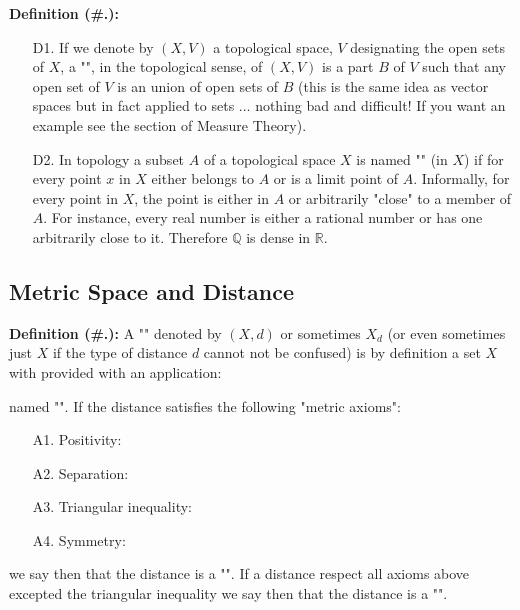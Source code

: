 	\textbf{Definition (\#\thesection.\mydef):} 
	\begin{enumerate}
		\item[D1.] If we denote by $(X, V)$ a topological space, $V$ designating the open sets of $X$, a "", in the topological sense, of $(X, V)$ is a part $B$ of $V$ such that any open set of $V$ is an union of open sets of $B$ (this is the same idea as vector spaces but in fact applied to sets ... nothing bad and difficult! If you want an example see the section of Measure Theory).
		
		\item[D2.] In topology a subset $A$ of a topological space $X$ is named "\label{dense set}" (in $X$) if for every point $x$ in $X$ either belongs to $A$ or is a limit point of $A$. Informally, for every point in $X$, the point is either in $A$ or arbitrarily "close" to a member of $A$. For instance, every real number is either a rational number or has one arbitrarily close to it. Therefore $\mathbb{Q}$ is dense in $\mathbb{R}$.
	\end{enumerate}
	
	\pagebreak
	\subsection{Metric Space and Distance}\label{distance}
	\textbf{Definition (\#\thesection.\mydef):} A "" denoted by $(X, d)$ or sometimes $X_d$ (or even sometimes just $X$ if the type of distance $d$ cannot not be confused) is by definition a set $X$ with provided with an application:
	
	named "". If the distance satisfies the following "metric axioms":
	\begin{itemize}
		\item[A1.] Positivity:
		
		
		\item[A2.] Separation:
		
		\item[A3.] Triangular inequality:
		
		
		\item[A4.] Symmetry: 
		
	\end{itemize}
	we say then that the distance is a "". If a distance respect all axioms above excepted the triangular inequality we say then that the distance is a "".
	
